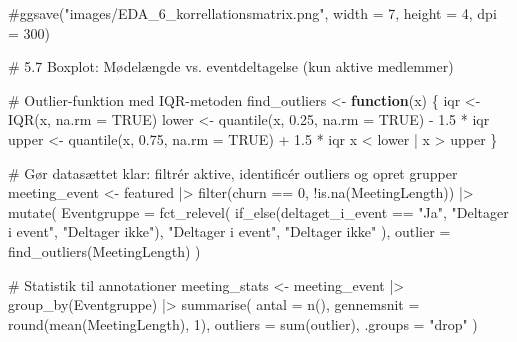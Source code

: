 \documentclass[
  11pt,
  letterpaper,
  DIV=11,
  numbers=noendperiod]{scrartcl}
\newenvironment{Shaded}{\begin{snugshade}}{\end{snugshade}}
\newcommand{\AttributeTok}[1]{\textcolor[rgb]{0.40,0.45,0.13}{#1}}
\newcommand{\CommentTok}[1]{\textcolor[rgb]{0.37,0.37,0.37}{#1}}
\newcommand{\ConstantTok}[1]{\textcolor[rgb]{0.56,0.35,0.01}{#1}}
\newcommand{\ControlFlowTok}[1]{\textcolor[rgb]{0.00,0.23,0.31}{\textbf{#1}}}
\newcommand{\DecValTok}[1]{\textcolor[rgb]{0.68,0.00,0.00}{#1}}
\newcommand{\FloatTok}[1]{\textcolor[rgb]{0.68,0.00,0.00}{#1}}
\newcommand{\FunctionTok}[1]{\textcolor[rgb]{0.28,0.35,0.67}{#1}}
\newcommand{\NormalTok}[1]{\textcolor[rgb]{0.00,0.23,0.31}{#1}}
\newcommand{\OtherTok}[1]{\textcolor[rgb]{0.00,0.23,0.31}{#1}}
\newcommand{\SpecialCharTok}[1]{\textcolor[rgb]{0.37,0.37,0.37}{#1}}
\newcommand{\StringTok}[1]{\textcolor[rgb]{0.13,0.47,0.30}{#1}}
\begin{document}
\begin{Shaded}
\begin{Highlighting}[]
\CommentTok{\#ggsave("images/EDA\_6\_korrellationsmatrix.png", width = 7, height = 4, dpi = 300)}


\CommentTok{\# 5.7 Boxplot: Mødelængde vs. eventdeltagelse (kun aktive medlemmer)}

\CommentTok{\# Outlier{-}funktion med IQR{-}metoden}
\NormalTok{find\_outliers }\OtherTok{\textless{}{-}} \ControlFlowTok{function}\NormalTok{(x) \{}
\NormalTok{  iqr }\OtherTok{\textless{}{-}} \FunctionTok{IQR}\NormalTok{(x, }\AttributeTok{na.rm =} \ConstantTok{TRUE}\NormalTok{)}
\NormalTok{  lower }\OtherTok{\textless{}{-}} \FunctionTok{quantile}\NormalTok{(x, }\FloatTok{0.25}\NormalTok{, }\AttributeTok{na.rm =} \ConstantTok{TRUE}\NormalTok{) }\SpecialCharTok{{-}} \FloatTok{1.5} \SpecialCharTok{*}\NormalTok{ iqr}
\NormalTok{  upper }\OtherTok{\textless{}{-}} \FunctionTok{quantile}\NormalTok{(x, }\FloatTok{0.75}\NormalTok{, }\AttributeTok{na.rm =} \ConstantTok{TRUE}\NormalTok{) }\SpecialCharTok{+} \FloatTok{1.5} \SpecialCharTok{*}\NormalTok{ iqr}
\NormalTok{  x }\SpecialCharTok{\textless{}}\NormalTok{ lower }\SpecialCharTok{|}\NormalTok{ x }\SpecialCharTok{\textgreater{}}\NormalTok{ upper}
\NormalTok{\}}

\CommentTok{\# Gør datasættet klar: filtrér aktive, identificér outliers og opret grupper}
\NormalTok{meeting\_event }\OtherTok{\textless{}{-}}\NormalTok{ featured }\SpecialCharTok{|\textgreater{}} 
  \FunctionTok{filter}\NormalTok{(churn }\SpecialCharTok{==} \DecValTok{0}\NormalTok{, }\SpecialCharTok{!}\FunctionTok{is.na}\NormalTok{(MeetingLength)) }\SpecialCharTok{|\textgreater{}} 
  \FunctionTok{mutate}\NormalTok{(}
    \AttributeTok{Eventgruppe =} \FunctionTok{fct\_relevel}\NormalTok{(}
      \FunctionTok{if\_else}\NormalTok{(deltaget\_i\_event }\SpecialCharTok{==} \StringTok{"Ja"}\NormalTok{, }\StringTok{"Deltager i event"}\NormalTok{, }\StringTok{"Deltager ikke"}\NormalTok{),}
      \StringTok{"Deltager i event"}\NormalTok{, }\StringTok{"Deltager ikke"}
\NormalTok{    ),}
    \AttributeTok{outlier =} \FunctionTok{find\_outliers}\NormalTok{(MeetingLength)}
\NormalTok{  )}

\CommentTok{\# Statistik til annotationer}
\NormalTok{meeting\_stats }\OtherTok{\textless{}{-}}\NormalTok{ meeting\_event }\SpecialCharTok{|\textgreater{}} 
  \FunctionTok{group\_by}\NormalTok{(Eventgruppe) }\SpecialCharTok{|\textgreater{}} 
  \FunctionTok{summarise}\NormalTok{(}
    \AttributeTok{antal =} \FunctionTok{n}\NormalTok{(),}
    \AttributeTok{gennemsnit =} \FunctionTok{round}\NormalTok{(}\FunctionTok{mean}\NormalTok{(MeetingLength), }\DecValTok{1}\NormalTok{),}
    \AttributeTok{outliers =} \FunctionTok{sum}\NormalTok{(outlier),}
    \AttributeTok{.groups =} \StringTok{"drop"}
\NormalTok{  )}


\end{Highlighting}
\end{Shaded}
\end{document}
